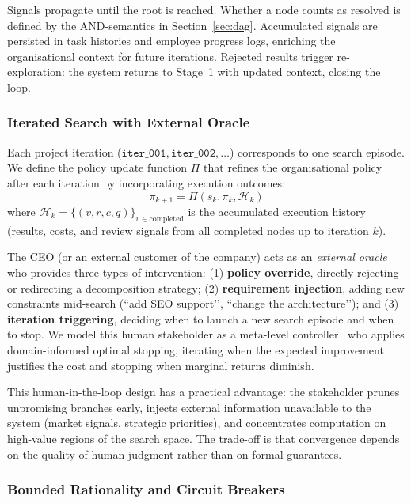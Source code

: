 \documentclass[11pt,a4paper]{article}
\begin{document}
Signals propagate until the root is reached.  Whether a node counts as resolved is defined by the AND-semantics in Section~\ref{sec:dag}.  Accumulated signals are persisted in task histories and employee progress logs, enriching the organisational context for future iterations.  Rejected results trigger re-exploration: the system returns to Stage~1 with updated context, closing the loop.

\subsubsection{Iterated Search with External Oracle}

Each project iteration ($\texttt{iter\_001}, \texttt{iter\_002}, \ldots$) corresponds to one search episode.  We define the policy update function $\Pi$ that refines the organisational policy after each iteration by incorporating execution outcomes:
\begin{equation}
\pi_{k+1} = \Pi(s_k, \pi_k, \mathcal{H}_k)
\end{equation}
where $\mathcal{H}_k = \{(v, r, c, q)\}_{v \in \text{completed}}$ is the accumulated execution history (results, costs, and review signals from all completed nodes up to iteration $k$).

The CEO (or an external customer of the company) acts as an \emph{external oracle} who provides three types of intervention: (1) \textbf{policy override}, directly rejecting or redirecting a decomposition strategy; (2) \textbf{requirement injection}, adding new constraints mid-search (``add SEO support’’, ``change the architecture’’); and (3) \textbf{iteration triggering}, deciding when to launch a new search episode and when to stop. We model this human stakeholder as a meta-level controller~\cite{russell1991right} who applies domain-informed optimal stopping, iterating when the expected improvement justifies the cost and stopping when marginal returns diminish.

This human-in-the-loop design has a practical advantage: the stakeholder prunes unpromising branches early, injects external information unavailable to the system (market signals, strategic priorities), and concentrates computation on high-value regions of the search space. The trade-off is that convergence depends on the quality of human judgment rather than on formal guarantees.

\subsubsection{Bounded Rationality and Circuit Breakers}
\end{document}
